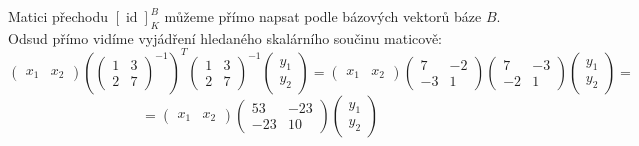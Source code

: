 \documentclass{article}
\begin{document}
Matici přechodu $[\operatorname{id}]_K^B$ můžeme přímo napsat podle bázových vektorů báze $B$. Odsud přímo vidíme vyjádření hledaného skalárního součinu maticově:
$$\begin{pmatrix}
  x_1 & x_2
\end{pmatrix}\left(\begin{pmatrix}
  1 & 3 \\ 2 & 7
\end{pmatrix}^{-1}\right)^T\begin{pmatrix}
  1 & 3 \\ 2 & 7
\end{pmatrix}^{-1}\begin{pmatrix}
  y_1 \\ y_2
\end{pmatrix}= \begin{pmatrix}
  x_1 & x_2
\end{pmatrix}\begin{pmatrix}
  7 & -2 \\ -3 & 1
\end{pmatrix}\begin{pmatrix}
  7 & -3 \\ -2 & 1
\end{pmatrix}\begin{pmatrix}
  y_1 \\ y_2
\end{pmatrix}=$$ $$=\begin{pmatrix}
  x_1 & x_2
\end{pmatrix}\begin{pmatrix}
  53 & -23 \\ -23 & 10
\end{pmatrix}\begin{pmatrix}
  y_1 \\ y_2
\end{pmatrix}$$
\end{document}
